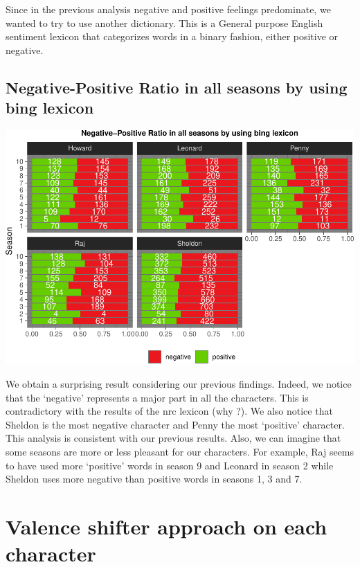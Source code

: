 \documentclass[
]{article}
\begin{document}
Since in the previous analysis negative and positive feelings
predominate, we wanted to try to use another dictionary. This is a
General purpose English sentiment lexicon that categorizes words in a
binary fashion, either positive or negative.

\hypertarget{negative-positive-ratio-in-all-seasons-by-using-bing-lexicon}{%
\subsection{Negative-Positive Ratio in all seasons by using bing
lexicon}\label{negative-positive-ratio-in-all-seasons-by-using-bing-lexicon}}

\includegraphics{report_files/figure-latex/unnamed-chunk-68-1.pdf}

We obtain a surprising result considering our previous findings. Indeed,
we notice that the `negative' represents a major part in all the
characters. This is contradictory with the results of the nrc lexicon
(why ?). We also notice that Sheldon is the most negative character and
Penny the most `positive' character. This analysis is consistent with
our previous results. Also, we can imagine that some seasons are more or
less pleasant for our characters. For example, Raj seems to have used
more `positive' words in season 9 and Leonard in season 2 while Sheldon
uses more negative than positive words in seasons 1, 3 and 7.

\hypertarget{valence-shifter-approach-on-each-character}{%
\section{Valence shifter approach on each
character}\label{valence-shifter-approach-on-each-character}}
\end{document}
